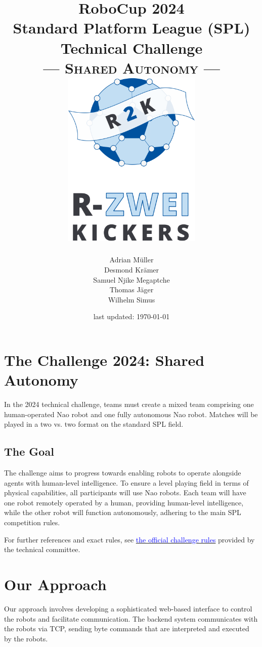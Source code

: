 \documentclass[a4paper]{article}
\title{RoboCup 2024 \\ Standard Platform League (SPL) \\ Technical Challenge \\ --- \textsc{Shared Autonomy} --- \\\vspace{2cm} \includegraphics[width=0.5\textwidth]{img/R2K_Logo}}
\date{last updated: \today}
\author{Adrian Müller \\ Desmond Krämer \\ Samuel Njike Megaptche \\ Thomas Jäger \\ Wilhelm Simus}
\begin{document}
	\setlength{\parindent}{0pt}
	\pagestyle{empty}
	\maketitle
	\newpage
	\pagestyle{headings}

\section{The Challenge 2024: Shared Autonomy}

In the 2024 technical challenge, teams must create a mixed team comprising one human-operated Nao robot and one 
fully autonomous Nao robot. Matches will be played in a two vs. two format on the standard SPL field.

\subsection{The Goal}

The challenge aims to progress towards enabling robots to operate alongside agents with human-level intelligence. 
To ensure a level playing field in terms of physical capabilities, all participants will use Nao robots. 
Each team will have one robot remotely operated by a human, providing human-level intelligence, 
while the other robot will function autonomously, adhering to the main SPL competition rules.

For further references and exact rules, see 
\href{https://spl.robocup.org/wp-content/uploads/SPL-Challenges-2024.pdf}{\textcolor{blue}{the official challenge rules}} 
provided by the technical committee.

\section{Our Approach}

Our approach involves developing a sophisticated web-based interface to control the robots and facilitate communication. 
The backend system communicates with the robots via TCP, sending byte commands that are interpreted and 
executed by the robots.

\vspace{0.75cm}
\end{document}
